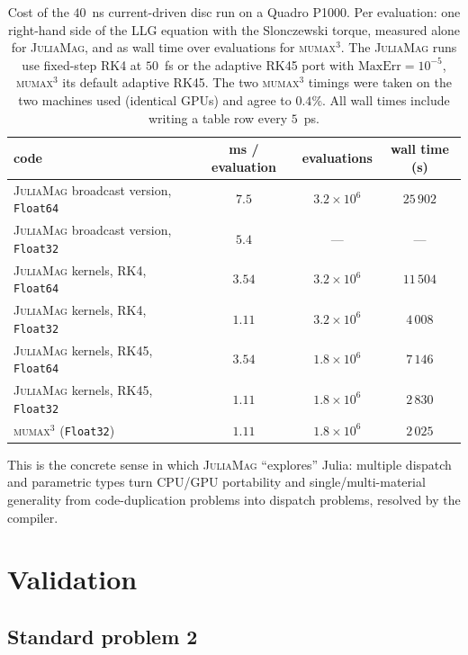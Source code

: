 \documentclass{article}      %
\newcommand{\JuliaMag}{\textsc{JuliaMag}}
\newcommand{\mumax}{\textsc{mumax}$^3$}
\begin{document}
\begin{table}[t]
  \centering
  \caption{Cost of the $40$~ns current-driven disc run on a Quadro P1000. Per
  evaluation: one right-hand side of the LLG equation with the Slonczewski
  torque, measured alone for \JuliaMag{}, and as wall time over evaluations
  for \mumax{}. The \JuliaMag{} runs use fixed-step RK4 at $50$~fs or the
  adaptive RK45 port with $\mathrm{MaxErr}=10^{-5}$, \mumax{} its default
  adaptive RK45. The two \mumax{} timings were taken on the two machines used
  (identical GPUs) and agree to $0.4\%$. All wall times include writing a
  table row every $5$~ps.}
  \label{tab:perf}
  \begin{tabular}{lccc}
    \hline
    code & ms / evaluation & evaluations & wall time (s) \\
    \hline
    \JuliaMag{} broadcast version, \texttt{Float64} & $7.5$  & $3.2\times10^{6}$ & $25\,902$ \\
    \JuliaMag{} broadcast version, \texttt{Float32} & $5.4$  & --- & --- \\
    \JuliaMag{} kernels, RK4, \texttt{Float64}      & $3.54$ & $3.2\times10^{6}$ & $11\,504$ \\
    \JuliaMag{} kernels, RK4, \texttt{Float32}      & $1.11$ & $3.2\times10^{6}$ & $4\,008$ \\
    \JuliaMag{} kernels, RK45, \texttt{Float64}     & $3.54$ & $1.8\times10^{6}$ & $7\,146$ \\
    \JuliaMag{} kernels, RK45, \texttt{Float32}     & $1.11$ & $1.8\times10^{6}$ & $2\,830$ \\
    \mumax{} (\texttt{Float32})                     & $1.11$ & $1.8\times10^{6}$ & $2\,025$ \\
    \hline
  \end{tabular}
\end{table}

This is the concrete sense
in which \JuliaMag{} ``explores'' Julia: multiple dispatch and parametric types
turn CPU/GPU portability and single/multi-material generality from
code-duplication problems into dispatch problems, resolved by the compiler.

\section{Validation}
\label{sec:validation}

\subsection{Standard problem 2}
\label{sec:std2}
\end{document}
